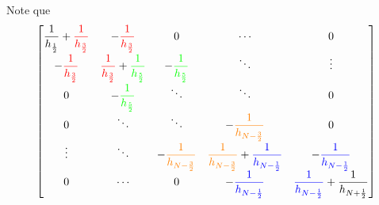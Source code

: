 Note que
\begin{align*}
	\begin{bmatrix}
		\dfrac{1}{h_{\frac{1}{2}}}+\mathcolor{red}{\mathcolor{red}{\dfrac{1}{h_{\frac{3}{2}}}}} & -\mathcolor{red}{\dfrac{1}{h_{\frac{3}{2}}}}                                              & 0                                                 & \cdots                                                                                          & 0                                                                           \\
		-\mathcolor{red}{\dfrac{1}{h_{\frac{3}{2}}}}                                            & \mathcolor{red}{\dfrac{1}{h_{\frac{3}{2}}}}+\mathcolor{green}{\dfrac{1}{h_{\frac{5}{2}}}} & -\mathcolor{green}{\dfrac{1}{h_{\frac{5}{2}}}}    & \ddots                                                                                          & \vdots                                                                      \\
		0                                                                                       & -\mathcolor{green}{\dfrac{1}{h_{\frac{5}{2}}}}                                            & \ddots                                            & \ddots                                                                                          & 0                                                                           \\
		0                                                                                       & \ddots                                                                                    & \ddots                                            & -\mathcolor{orange}{\dfrac{1}{h_{N-\frac{3}{2}}}}                                               & 0                                                                           \\
		\vdots                                                                                  & \ddots                                                                                    & -\mathcolor{orange}{\dfrac{1}{h_{N-\frac{3}{2}}}} & \mathcolor{orange}{\dfrac{1}{h_{N-\frac{3}{2}}}}+\mathcolor{blue}{\dfrac{1}{h_{N-\frac{1}{2}}}} & -\mathcolor{blue}{\dfrac{1}{h_{N-\frac{1}{2}}}}                             \\
		0                                                                                       & \cdots                                                                                    & 0                                                 & -\mathcolor{blue}{\dfrac{1}{h_{N-\frac{1}{2}}}}                                                 & \mathcolor{blue}{\dfrac{1}{h_{N-\frac{1}{2}}}}+\dfrac{1}{h_{N+\frac{1}{2}}}

\end{bmatrix}
\end{align*}
